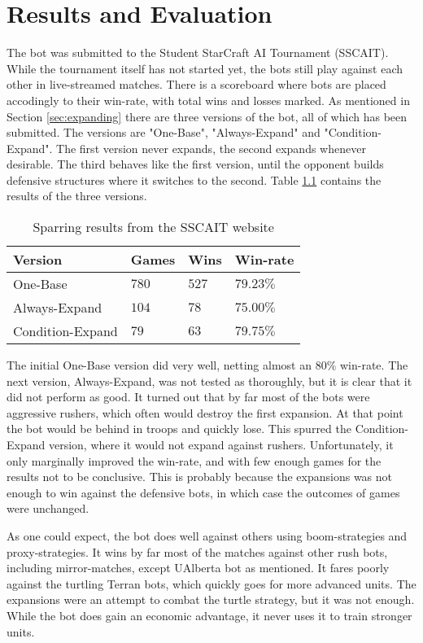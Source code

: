 \chapter{Results and Evaluation}
\label{ch:results}
The bot was submitted to the Student StarCraft AI Tournament (SSCAIT). While the tournament itself has not started yet, the bots still play against each other in live-streamed matches. There is a scoreboard where bots are placed accodingly to their win-rate, with total wins and losses marked. As mentioned in Section \ref{sec:expanding} there are three versions of the bot, all of which has been submitted. The versions are "One-Base", "Always-Expand" and "Condition-Expand". The first version never expands, the second expands whenever desirable. The third behaves like the first version, until the opponent builds defensive structures where it switches to the second. Table \ref{tab:results} contains the results of the three versions.

\begin{table}
\begin{center}
\begin{tabularx}{\linewidth}{|X||l|l|l|}
	\hline
	Version				& Games	& Wins	& Win-rate	\\
	\hline
	One-Base			& $780$	& $527$	& $79.23\%$	\\
	Always-Expand		& $104$	& $78$	& $75.00\%$	\\
	Condition-Expand	& $79$	& $63$	& $79.75\%$	\\
	\hline
\end{tabularx}
\end{center}
\caption{Sparring results from the SSCAIT website}
\label{tab:results}
\end{table}

The initial One-Base version did very well, netting almost an $80\%$ win-rate. The next version, Always-Expand, was not tested as thoroughly, but it is clear that it did not perform as good. It turned out that by far most of the bots were aggressive rushers, which often would destroy the first expansion. At that point the bot would be behind in troops and quickly lose. This spurred the Condition-Expand version, where it would not expand against rushers. Unfortunately, it only marginally improved the win-rate, and with few enough games for the results not to be conclusive. This is probably because the expansions was not enough to win against the defensive bots, in which case the outcomes of games were unchanged.

As one could expect, the bot does well against others using boom-strategies and proxy-strategies. It wins by far most of the matches against other rush bots, including mirror-matches, except UAlberta bot as mentioned. It fares poorly against the turtling Terran bots, which quickly goes for more advanced units. The expansions were an attempt to combat the turtle strategy, but it was not enough. While the bot does gain an economic advantage, it never uses it to train stronger units.

